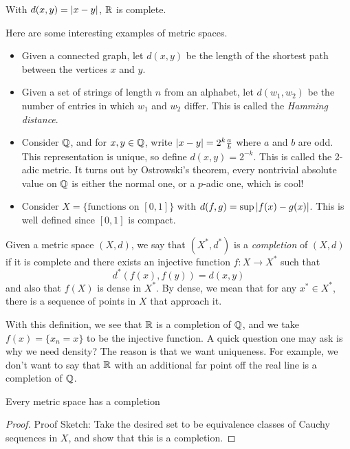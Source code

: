 \begin{theorem}
	With $d(x, y) = \left\lvert {x - y} \right\rvert$, $\mathbb{R}$ is complete. 
\end{theorem}

Here are some interesting examples of metric spaces. 

\begin{itemize}
	\item Given a connected graph, let $d(x, y)$ be the length of the shortest path between the vertices $x$ and $y$. 
	\item Given a set of strings of length $n$ from an alphabet, let $d(w_1, w_2)$ be the number of entries in which $w_1$ and $w_2$ differ. This is called the \emph{Hamming distance}.
	\item Consider $\mathbb{Q}$, and for $x, y \in \mathbb{Q}$, write $\left\lvert {x - y} \right\rvert = 2^{k}\frac{a}{b}$ where $a$ and $b$ are odd. This representation is unique, so define $d(x, y) = 2^{-k}$. This is called the 2-adic metric. It turns out by Ostrowski's theorem, every nontrivial absolute value on $\mathbb{Q}$ is either the normal one, or a $p$-adic one, which is cool!
	\item Consider $X = \{\text{functions on } [0, 1]\}$ with $d(f, g) = \sup\left\lvert {f(x) - g(x)} \right\rvert$. This is well defined since $[0, 1]$ is compact. 
\end{itemize}

\begin{definition}
	Given a metric space $(X, d)$, we say that $(X^{*}, d^{*})$ is a \emph{completion} of $(X, d)$ if it is complete and there exists an injective function $f : X \to X^{*}$ such that
	\[ d^{*}(f(x), f(y)) = d(x, y) \]
	and also that $f(X)$ is dense in $X^{*}$. By dense, we mean that for any $x^{*} \in X^{*}$, there is a sequence of points in $X$ that approach it. 
\end{definition}

With this definition, we see that $\mathbb{R}$ is a completion of $\mathbb{Q}$, and we take $f(x) = \{x_n = x\}$ to be the injective function. A quick question one may ask is why we need density? The reason is that we want uniqueness. For example, we don't want to say that $\mathbb{R}$ with an additional far point off the real line is a completion of $\mathbb{Q}$.

\begin{theorem}
	Every metric space has a completion
\end{theorem}
\begin{proof}{Proof Sketch:}
	Take the desired set to be equivalence classes of Cauchy sequences in $X$, and show that this is a completion.
\end{proof}

